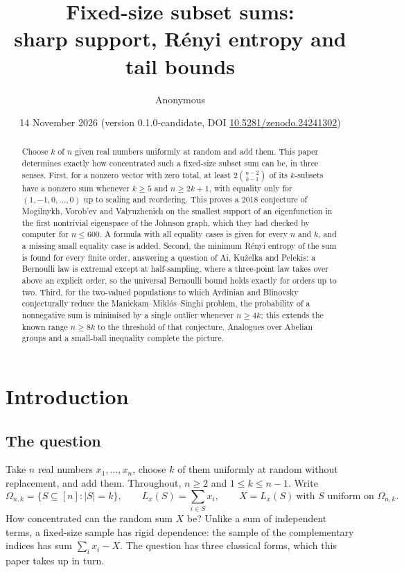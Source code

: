 \documentclass[11pt]{article}
\title{Fixed-size subset sums:\\ sharp support, R\'enyi entropy and tail bounds}
\author{Anonymous}
\date{14 November 2026 {\small(version 0.1.0-candidate, DOI \href{https://doi.org/10.5281/zenodo.24241302}{10.5281/zenodo.24241302})}}
\theoremstyle{remark}
\begin{document}
\maketitle
\vspace{-1.5em}
\begin{abstract}
Choose \(k\) of \(n\) given real numbers uniformly at random and add them.
This paper determines exactly how concentrated such a fixed-size subset sum
can be, in three senses. First, for a nonzero vector with zero total, at least
\(2\binom{n-2}{k-1}\) of its \(k\)-subsets have a nonzero sum whenever
\(k\ge5\) and \(n\ge2k+1\), with equality only for \((1,-1,0,\ldots,0)\) up to
scaling and reordering. This proves a 2018 conjecture of Mogilnykh,
Vorob'ev and Valyuzhenich on the smallest support of an eigenfunction in the
first nontrivial eigenspace of the Johnson graph, which they had checked by
computer for \(n\le600\). A formula with all equality cases is given for every
\(n\) and \(k\), and a missing small equality case is added. Second, the
minimum R\'enyi entropy of the sum is found for every finite order, answering
a question of Ai, Ku\v{z}elka and Pelekis: a Bernoulli law is extremal except
at half-sampling, where a three-point law takes over above an explicit order,
so the universal Bernoulli bound holds exactly for orders up to two. Third,
for the two-valued populations to which Aydinian and Blinovsky conjecturally
reduce the Manickam--Mikl\'os--Singhi problem, the probability of a
nonnegative sum is minimised by a single outlier whenever \(n\ge4k\); this
extends the known range \(n\ge8k\) to the threshold of that conjecture.
Analogues over Abelian groups and a small-ball inequality complete the
picture.
\end{abstract}

\tableofcontents

\section{Introduction}\label{sec:intro}

\subsection{The question}
Take \(n\) real numbers \(x_1,\ldots,x_n\), choose \(k\) of them uniformly at
random without replacement, and add them. Throughout, \(n\ge2\) and
\(1\le k\le n-1\). Write
\[
 \Omega_{n,k}=\{S\subseteq[n]:|S|=k\},\qquad
 L_x(S)=\sum_{i\in S}x_i,\qquad X=L_x(S)\ \text{with }S\text{ uniform on }\Omega_{n,k}.
\]
How concentrated can the random sum \(X\) be? Unlike a sum of independent
terms, a fixed-size sample has rigid dependence: the sample of the
complementary indices has sum \(\sum_ix_i-X\). The question has three
classical forms, which this paper takes up in turn.
\end{document}
